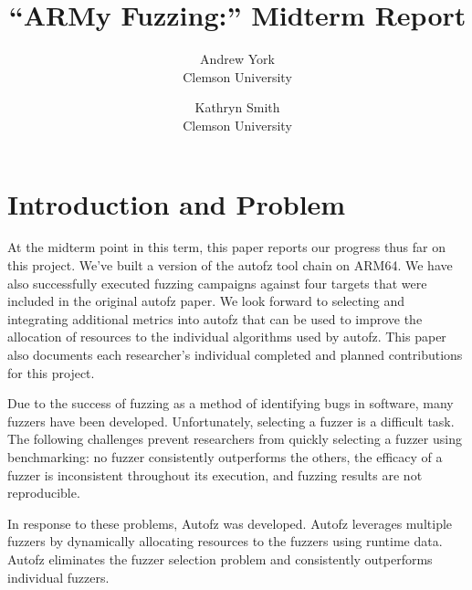 
\graphicspath{ {./images/} }

\date{}

\title{\Large \bf “ARMy Fuzzing:” Midterm Report}

\author{
{\rm Andrew York}\\
Clemson University
\and
{\rm Kathryn Smith}\\
Clemson University
} %

\maketitle

\section{Introduction and Problem}

At the midterm point in this term, this paper reports our progress thus far on 
this project. We've built a version of the autofz tool chain on ARM64. We have 
also successfully executed fuzzing campaigns against four targets that were included 
in the original autofz paper. We look forward to selecting and integrating additional 
metrics into autofz that can be used to improve the allocation of resources to the 
individual algorithms used by autofz. This paper also documents each researcher's 
individual completed and planned contributions for this project.

Due to the success of fuzzing as a method of identifying bugs in software, many fuzzers have been developed. 
Unfortunately, selecting a fuzzer is a difficult task. The following challenges 
prevent researchers from quickly selecting a fuzzer using benchmarking: no fuzzer 
consistently outperforms the others, the efficacy of a fuzzer is inconsistent 
throughout its execution, and fuzzing results are not reproducible. 

In response to these problems, Autofz was developed. Autofz leverages multiple 
fuzzers by dynamically allocating resources to the fuzzers using runtime data. 
Autofz eliminates the fuzzer selection problem and consistently outperforms 
individual fuzzers. 

